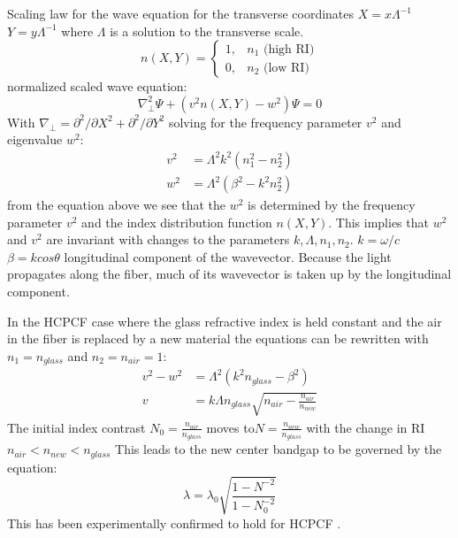 Scaling law for the wave equation for the transverse coordinates
$X=x\Lambda^{-1}$ $Y=y\Lambda^{-1}$
where $\Lambda$ is a solution to the transverse scale.
\begin{equation}
	n(X, Y) = \begin{cases}
		1, & n_1 \text{   (high RI)} \\
		0, & n_2 \text{   (low RI)}
	\end{cases}
\end{equation}
normalized scaled wave equation:
\begin{equation}
	\nabla_\perp^2\Psi + (v^2n(X, Y) - w^2)\Psi = 0
\end{equation}
With $\nabla_\perp = \partial^2/\partial X^2 + \partial^2/\partial Y^2 $
solving for the frequency parameter $v^2$ and eigenvalue $w^2$:
\begin{equation}
	\begin{aligned}
		v^2 & = \Lambda^2k^2(n_1^2 - n_2^2)   \\
		w^2 & = \Lambda^2(\beta^2 - k^2n_2^2)
	\end{aligned}
\end{equation}
from the equation above we see that the $w^2$ is determined by the frequency parameter $v^2$ and the index distribution function $n(X, Y)$.
This implies that $w^2$ and $v^2$ are invariant with changes to the parameters $k, \Lambda, n_1, n_2$.
$k = \omega/c$ $\beta = kcos\theta$ longitudinal component of the wavevector. Because the light propagates along the fiber, much of its wavevector is taken up by the longitudinal component.

In the HCPCF case where the glass refractive index is held constant and the air in the fiber is replaced by a new material the equations can be rewritten with $n_1 = n_{glass}$ and $n_2 = n_{air}=1$:
\begin{equation}
	\begin{aligned}
		v^2 - w^2 & = \Lambda^2(k^2n_{glass} - \beta^2)                          \\
		v         & = k\Lambda n_{glass}\sqrt{n_{air} - \frac{n_{air}}{n_{new}}}
	\end{aligned}
\end{equation}
The initial index contrast $N_0 = \frac{n_{air}}{n_{glass}}$ moves to$ N = \frac{n_{new}}{n_{glass}}$ with the change in RI $n_{air} <  n_{new} < n_{glass}$
This leads to the new center bandgap to be governed by the equation:
\begin{equation}
	\lambda = \lambda_0\sqrt{\frac{1-N^{-2}}{1-N_0^{-2}}}
\end{equation}
This has been experimentally confirmed to hold for HCPCF \cite{antonopoulos}.




